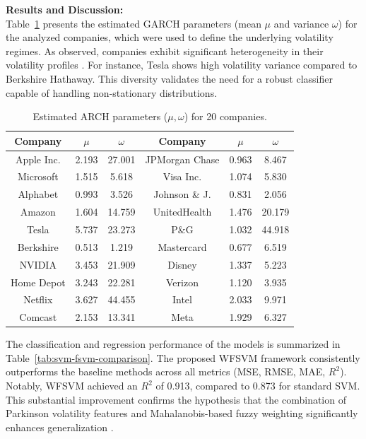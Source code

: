 \documentclass[twoside]{article}
\begin{document}
	\noindent\textbf{Results and Discussion:} \\
	Table~\ref{tab:arch_results} presents the estimated GARCH parameters (mean $\mu$ and variance $\omega$) for the analyzed companies, which were used to define the underlying volatility regimes. As observed, companies exhibit significant heterogeneity in their volatility profiles \cite{Cifter2013}. For instance, Tesla shows high volatility variance compared to Berkshire Hathaway. This diversity validates the need for a robust classifier capable of handling non-stationary distributions.
	
\begin{table}[h!]
	\centering
	\small
	\caption{Estimated ARCH parameters ($\mu, \omega$) for 20 companies.}
	\begin{tabular}{|c|c|c||c|c|c|}
		\hline
		\textbf{Company} & \textbf{$\mu$} & \textbf{$\omega$} & \textbf{Company} & \textbf{$\mu$} & \textbf{$\omega$} \\ \hline
		Apple Inc. & 2.193 & 27.001 & JPMorgan Chase & 0.963 & 8.467 \\ \hline
		Microsoft & 1.515 & 5.618 & Visa Inc. & 1.074 & 5.830 \\ \hline
		Alphabet & 0.993 & 3.526 & Johnson \& J. & 0.831 & 2.056 \\ \hline
		Amazon & 1.604 & 14.759 & UnitedHealth & 1.476 & 20.179 \\ \hline
		Tesla & 5.737 & 23.273 & P\&G & 1.032 & 44.918 \\ \hline
		Berkshire & 0.513 & 1.219 & Mastercard & 0.677 & 6.519 \\ \hline
		NVIDIA & 3.453 & 21.909 & Disney & 1.337 & 5.223 \\ \hline
		Home Depot & 3.243 & 22.281 & Verizon & 1.120 & 3.935 \\ \hline
		Netflix & 3.627 & 44.455 & Intel & 2.033 & 9.971 \\ \hline
		Comcast & 2.153 & 13.341 & Meta & 1.929 & 6.327 \\ \hline
	\end{tabular}
	\label{tab:arch_results}
\end{table}
	The classification and regression performance of the models is summarized in Table~\ref{tab:svm-fsvm-comparison}. The proposed WFSVM framework consistently outperforms the baseline methods across all metrics (MSE, RMSE, MAE, $R^2$). Notably, WFSVM achieved an $R^2$ of 0.913, compared to 0.873 for standard SVM. This substantial improvement confirms the hypothesis that the combination of Parkinson volatility features and Mahalanobis-based fuzzy weighting significantly enhances generalization \cite{Clark2018}.
	
\end{document}
